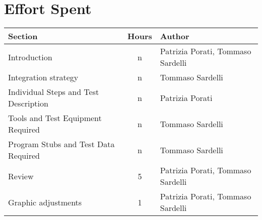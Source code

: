 \pagebreak
\section{Effort Spent}

\begin{center}
	\vspace{0.2cm}
	\begin{tabular}{ l c l } 
		\hline
		Section 					& Hours & Author \\ 
		\hline
		Introduction								& n 	& Patrizia Porati, Tommaso Sardelli	\\
		Integration strategy						& n 	& Tommaso Sardelli	\\
		Individual Steps and Test Description 		& n 	& Patrizia Porati \\ 
		Tools and Test Equipment Required 			& n	 	& Tommaso Sardelli \\
		Program Stubs and Test Data Required		& n		& Tommaso Sardelli \\
		Review										& 5		& Patrizia Porati, Tommaso Sardelli	\\
		Graphic adjustments     				    & 1		& Patrizia Porati, Tommaso Sardelli	\\
		\hline
	\end{tabular}
\end{center}
